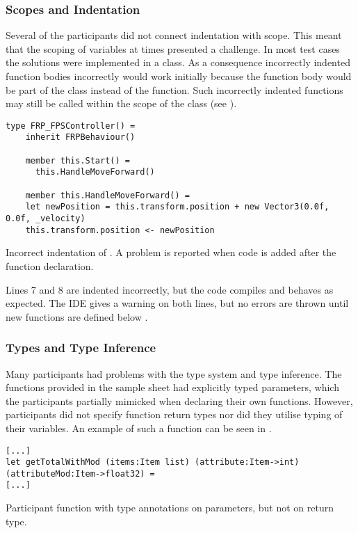 \subsubsection{Scopes and Indentation}
Several of the participants did not connect indentation with scope. This meant that the scoping of variables at times presented a challenge. In most test cases the solutions were implemented in a class. As a consequence incorrectly indented function bodies incorrectly would work initially because the function body would be part of the class instead of the function. Such incorrectly indented functions may still be called within the scope of the class (see ).

\begin{listing}[H]
\begin{verbatim}
type FRP_FPSController() =
    inherit FRPBehaviour()

    member this.Start() =
      this.HandleMoveForward()

    member this.HandleMoveForward() =
    let newPosition = this.transform.position + new Vector3(0.0f, 0.0f, _velocity)
    this.transform.position <- newPosition
\end{verbatim}
\caption{Incorrect indentation of . A problem is reported when code is added after the function declaration.}
\label{lst:scope-prob}
\end{listing}

Lines 7 and 8 are indented incorrectly, but the code compiles and behaves as expected. The \gls{IDE} gives a warning on both lines, but no errors are thrown until new  functions are defined below .

\subsubsection{Types and Type Inference}
Many participants had problems with the type system and type inference. The functions provided in the sample sheet had explicitly typed parameters, which the participants partially mimicked when declaring their own functions. However, participants did not specify function return types nor did they utilise typing of their variables. An example of such a function can be seen in .

\begin{listing}[H]
\begin{verbatim}
[...]
let getTotalWithMod (items:Item list) (attribute:Item->int) (attributeMod:Item->float32) =
[...]
\end{verbatim}
\caption{Participant function with type annotations on parameters, but not on return type.}
\label{lst:part-func}
\end{listing}

